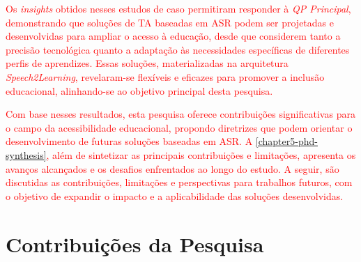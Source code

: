 \textcolor{red}{Os \textit{insights} obtidos nesses estudos de caso permitiram responder à \textit{QP Principal}, demonstrando que soluções de TA baseadas em ASR podem ser projetadas e desenvolvidas para ampliar o acesso à educação, desde que considerem tanto a precisão tecnológica quanto a adaptação às necessidades específicas de diferentes perfis de aprendizes. Essas soluções, materializadas na arquitetura \textit{Speech2Learning}, revelaram-se flexíveis e eficazes para promover a inclusão educacional, alinhando-se ao objetivo principal desta pesquisa.}

\textcolor{red}{Com base nesses resultados, esta pesquisa oferece contribuições significativas para o campo da acessibilidade educacional, propondo diretrizes que podem orientar o desenvolvimento de futuras soluções baseadas em ASR. A \autoref{chapter5-phd-synthesis}, além de sintetizar as principais contribuições e limitações, apresenta os avanços alcançados e os desafios enfrentados ao longo do estudo. A seguir, são discutidas as contribuições, limitações e perspectivas para trabalhos futuros, com o objetivo de expandir o impacto e a aplicabilidade das soluções desenvolvidas.}


\section{Contribuições da Pesquisa}



